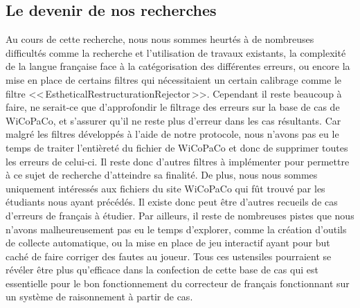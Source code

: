 \documentclass[11pt]{article}
\begin{document}
\subsection{Le devenir de nos recherches}
Au cours de cette recherche, nous nous sommes heurt\'{e}s \`{a} de nombreuses difficult\'{e}s comme la recherche et l'utilisation de travaux existants, la complexit\'{e} de la langue fran\c{c}aise face \`{a} la cat\'{e}gorisation des diff\'{e}rentes erreurs, ou encore la mise en place de certains filtres qui n\'{e}cessitaient un certain calibrage comme le filtre <<\,EstheticalRestructurationRejector\,>>.
\newline
\newline
Cependant il reste beaucoup \`{a} faire, ne serait-ce que d'approfondir le filtrage des erreurs sur la base de cas de WiCoPaCo, et s'assurer qu'il ne reste plus d'erreur dans les cas r\'{e}sultants. Car malgr\'{e} les filtres d\'{e}velopp\'{e}s \`{a} l'aide de notre protocole, nous n'avons pas eu le temps de traiter l'enti\`{e}ret\'{e} du fichier de WiCoPaCo et donc de supprimer toutes les erreurs de celui-ci. Il reste donc d'autres filtres \`{a} impl\'{e}menter pour permettre \`{a} ce sujet de recherche d'atteindre sa finalit\'{e}. De plus, nous nous sommes uniquement int\'{e}ress\'{e}s aux fichiers du site WiCoPaCo qui f\^{u}t trouv\'{e} par les \'{e}tudiants nous ayant pr\'{e}c\'{e}d\'{e}s. Il existe donc peut \^{e}tre d'autres recueils de cas d'erreurs de fran\c{c}ais \`{a} \'{e}tudier. 
\newline
\newline
Par ailleurs, il reste de nombreuses pistes que nous n'avons malheureusement pas eu le temps d'explorer, comme la cr\'{e}ation d'outils de collecte automatique, ou la mise en place de jeu interactif ayant pour but cach\'{e} de faire corriger des fautes au joueur. 
\newline
\newline
Tous ces ustensiles pourraient se r\'{e}v\'{e}ler \^{e}tre plus qu'efficace dans la confection de cette base de cas qui est essentielle pour le bon fonctionnement du correcteur de fran\c{c}ais fonctionnant sur un syst\`{e}me de raisonnement \`{a} partir de cas.  
\end{document}
